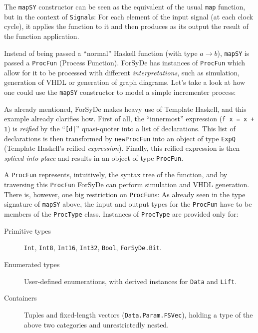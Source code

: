 \documentclass[a4paper]{article}
\begin{document}
                The \texttt{mapSY} constructor can be seen as the equivalent of the usual
                \texttt{map} function, but in the context of \texttt{Signal}s: For each element of
                the input signal (at each clock cycle), it applies the function to it and then
                produces as its output the result of the function application.

                Instead of being passed a ``normal'' Haskell function (with type $a → b$),
                \texttt{mapSY} is passed a \texttt{ProcFun} (Process Function). ForSyDe has
                instances of \texttt{ProcFun} which allow for it to be processed with different
                \emph{interpretations}, such as simulation, generation of VHDL or generation of
                graph diagrams. Let's take a look at how one could use the \texttt{mapSY}
                constructor to model a simple incrementer process:


                As already mentioned, ForSyDe makes heavy use of Template Haskell, and this example
                already clarifies how. First of all, the ``innermost'' expression
                (\verb;f x = x + 1;) is \emph{reified} by the ``\texttt{[d|}'' quasi-quoter into a
                list of declarations. This list of declarations is then transformed by
                \texttt{newProcFun} into an object of type \texttt{ExpQ} (Template Haskell's
                reified \emph{expression}). Finally, this reified expression is then
                \emph{spliced into place} and results in an object of type \texttt{ProcFun}.

                A \texttt{ProcFun} represents, intuitively, the syntax tree of the function, and
                by traversing this \texttt{ProcFun} ForSyDe can perform simulation and VHDL
                generation. There is, however, one big restriction on \texttt{ProcFun}s: As already
                seen in the type signature of \texttt{mapSY} above, the input and output types for
                the \texttt{ProcFun} have to be members of the \texttt{ProcType} class. Instances of
                \texttt{ProcType} are provided only for:

                \begin{description}
                    \item[Primitive types] \texttt{Int}, \texttt{Int8}, \texttt{Int16},
                        \texttt{Int32}, \texttt{Bool}, \texttt{ForSyDe.Bit}.
                    \item[Enumerated types] User-defined enumerations, with derived instances for
                        \texttt{Data} and \texttt{Lift}.
                    \item[Containers] Tuples and fixed-length vectors (\texttt{Data.Param.FSVec}),
                        holding a type of the above two categories and unrestrictedly nested.
                \end{description}
\end{document}
